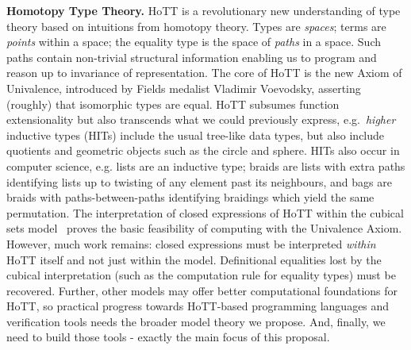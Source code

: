 \documentclass[a4paper,11pt]{article}
\begin{document}
{\bf Homotopy Type Theory.} HoTT is a revolutionary new understanding of
type theory based on intuitions from homotopy theory. Types are
\emph{spaces}; terms are \emph{points} within a space; the equality
type is the space of \emph{paths} in a space. Such paths contain
non-trivial structural information enabling us to program and reason up to invariance of
representation. The core of HoTT is the new Axiom of Univalence,
introduced by Fields medalist Vladimir Voevodsky, asserting (roughly)
that isomorphic types are equal. HoTT subsumes function extensionality
but also transcends what we could previously express, e.g.\
\emph{higher} inductive types (HITs) include the usual tree-like data
types, but also include quotients \cite{alti:mpc04} and geometric
objects such as the circle and sphere. HITs also occur in computer
science, e.g. lists are an inductive type; braids are lists with extra
paths identifying lists up to twisting of any element past its
neighbours, and bags are braids with paths-between-paths identifying
braidings which yield the same permutation. 
The interpretation of closed expressions of HoTT within the cubical
sets model~\cite{BezemM:cubsmt} proves the basic feasibility of computing
with the Univalence Axiom. However, much work remains: closed
expressions  must be interpreted  \emph{within} HoTT itself and 
not just within the model. Definitional equalities lost by the cubical interpretation (such as
the computation rule for equality types) must be recovered. Further, other models may
offer better computational foundations for HoTT, so practical progress
towards HoTT-based programming languages and verification tools needs
the broader model theory we propose. And, finally, we need to build those
tools - exactly the main focus of this proposal.










\end{document}
